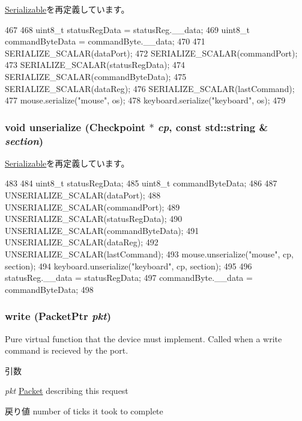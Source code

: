 \hyperlink{classSerializable_ad6272f80ae37e8331e3969b3f072a801}{Serializable}を再定義しています。


\begin{DoxyCode}
467 {
468     uint8_t statusRegData = statusReg.__data;
469     uint8_t commandByteData = commandByte.__data;
470     
471     SERIALIZE_SCALAR(dataPort);
472     SERIALIZE_SCALAR(commandPort);
473     SERIALIZE_SCALAR(statusRegData);
474     SERIALIZE_SCALAR(commandByteData);
475     SERIALIZE_SCALAR(dataReg);
476     SERIALIZE_SCALAR(lastCommand);
477     mouse.serialize("mouse", os);
478     keyboard.serialize("keyboard", os);
479 }
\end{DoxyCode}
\hypertarget{classX86ISA_1_1I8042_af22e5d6d660b97db37003ac61ac4ee49}{
\subsubsection[{unserialize}]{\setlength{\rightskip}{0pt plus 5cm}void unserialize ({\bf Checkpoint} $\ast$ {\em cp}, \/  const std::string \& {\em section})}}
\label{classX86ISA_1_1I8042_af22e5d6d660b97db37003ac61ac4ee49}


\hyperlink{classSerializable_af100c4e9feabf3cd918619c88c718387}{Serializable}を再定義しています。


\begin{DoxyCode}
483 {
484     uint8_t statusRegData;
485     uint8_t commandByteData;
486 
487     UNSERIALIZE_SCALAR(dataPort);
488     UNSERIALIZE_SCALAR(commandPort);
489     UNSERIALIZE_SCALAR(statusRegData);
490     UNSERIALIZE_SCALAR(commandByteData);
491     UNSERIALIZE_SCALAR(dataReg);
492     UNSERIALIZE_SCALAR(lastCommand);
493     mouse.unserialize("mouse", cp, section);
494     keyboard.unserialize("keyboard", cp, section);
495 
496     statusReg.__data = statusRegData;
497     commandByte.__data = commandByteData;
498 }
\end{DoxyCode}
\hypertarget{classX86ISA_1_1I8042_a4cefab464e72b5dd42c003a0a4341802}{
\subsubsection[{write}]{ write ({\bf PacketPtr} {\em pkt})}}
\label{classX86ISA_1_1I8042_a4cefab464e72b5dd42c003a0a4341802}
Pure virtual function that the device must implement. Called when a write command is recieved by the port. 
\begin{DoxyParams}{引数}
\item[{\em pkt}]\hyperlink{classPacket}{Packet} describing this request \end{DoxyParams}
\begin{DoxyReturn}{戻り値}
number of ticks it took to complete 
\end{DoxyReturn}


